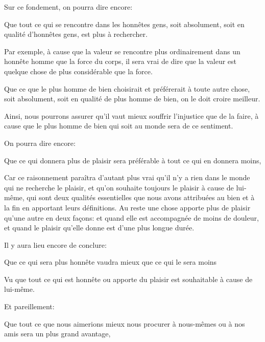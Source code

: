 \bigbreak

Sur ce fondement, on pourra dire encore:

\begin{lieu}
	Que tout ce qui se rencontre dans les honnêtes gens, soit absolument, soit en qualité d’honnêtes gens, est plus à rechercher.
\end{lieu}

Par exemple, à cause que la valeur se rencontre plus ordinairement dans un honnête homme que la force du corps, il sera vrai de
dire que la valeur est quelque chose de plus considérable que la force.

\bigbreak

\begin{lieu}
	Que ce que le plus homme de bien choisirait et préférerait à toute autre chose, soit absolument, soit en qualité de plus homme de
	bien, on le doit croire meilleur.
\end{lieu}

Ainsi, nous pourrons assurer qu'il vaut mieux souffrir l'injustice que de la faire, à cause que le plus homme de bien qui soit au monde
sera de ce sentiment.

On pourra dire encore:

\begin{lieu}
	Que ce qui donnera plus de plaisir sera préférable à tout ce qui en donnera moins,
\end{lieu}

Car ce raisonnement paraîtra d'autant plus vrai qu'il n'y a rien dans le monde qui ne recherche le plaisir, et qu'on souhaite
toujours le plaisir à cause de lui-même, qui sont deux qualités essentielles que nous avons attribuées au bien et à la fin en
apportant leurs définitions. Au reste une chose apporte plus de plaisir qu'une autre en deux façons: et quand elle est
accompagnée de moins de douleur, et quand le plaisir qu'elle donne est d'une plus longue durée.

Il y aura lieu encore de conclure:

\begin{lieu}
	Que ce qui sera plus honnête vaudra mieux que ce qui le sera moins
\end{lieu}

Vu que tout ce qui est honnête ou apporte du plaisir est souhaitable à cause de lui-même.

\bigbreak

Et pareillement:

\begin{lieu}
	Que tout ce que nous aimerions mieux nous procurer à nous-mêmes ou à nos amis sera un plus grand avantage,
\end{lieu}

